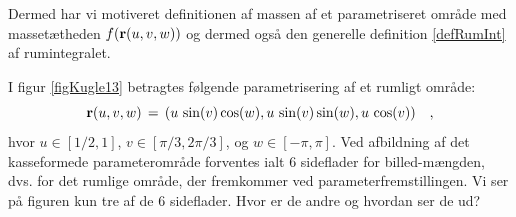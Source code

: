 Dermed har vi motiveret definitionen af massen af et
parametriseret område med massetætheden $f({\bf r}(u, v, w))$ og
dermed også den generelle definition
\ref{defRumInt} af rumintegralet.


\begin{exercise}
I figur \ref{figKugle13} betragtes følgende parametrisering af et
rumligt område:
\begin{equation}
{\bf r}(u, v, w) \, = \, (u\,\sin(v)\cos(w), u\,\sin(v)\sin(w),
u\,\cos(v) ) \quad ,
\end{equation}
hvor $u \in [1/2, 1 ]$, $v \in [\pi/3,
2\pi/3]$, og $w \in [-\pi, \pi]$.
Ved afbildning af det kasseformede parameterområde forventes ialt
$6$ sideflader for billed-mæng\-den, dvs. for det rumlige område, der fremkommer ved parameterfremstillingen. Vi ser på figuren kun tre af de
$6$ sideflader. Hvor er de andre og hvordan ser de ud?
\end{exercise}





